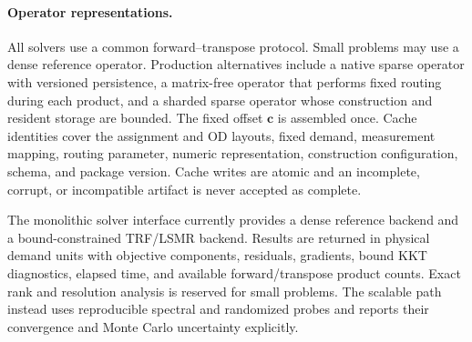 \paragraph{Operator representations.}
All solvers use a common forward--transpose protocol.  Small problems may use a
dense reference operator.  Production alternatives include a native sparse
operator with versioned persistence, a matrix-free operator that performs fixed
routing during each product, and a sharded sparse operator whose construction
and resident storage are bounded.  The fixed offset $\bm c$ is assembled once.
Cache identities cover the assignment and OD layouts, fixed demand,
measurement mapping, routing parameter, numeric representation, construction
configuration, schema, and package version.  Cache writes are atomic and an
incomplete, corrupt, or incompatible artifact is never accepted as complete.

The monolithic solver interface currently provides a dense reference backend
and a bound-constrained TRF/LSMR backend.  Results are returned in physical
demand units with objective components, residuals, gradients, bound KKT
diagnostics, elapsed time, and available forward/transpose product counts.
Exact rank and resolution analysis is reserved for small problems.  The
scalable path instead uses reproducible spectral and randomized probes and
reports their convergence and Monte Carlo uncertainty explicitly.

